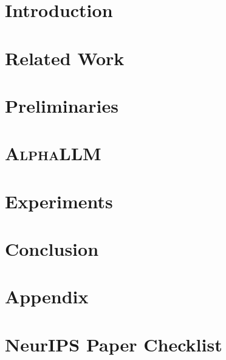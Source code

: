 \documentclass{article}
\newcommand{\model}[0]{\textsc{AlphaLLM}}
\begin{document}
\section{Introduction}
\label{sec:intro}


\section{Related Work}
\label{sec:related_work}


\section{Preliminaries}
\label{sec:pre}


\section{\model{}}
\label{sec:method}


\section{Experiments}
\label{sec:exp}


% 

\section{Conclusion}
\label{sec:con}



\medskip
\newpage



\newpage
\appendix
\section{Appendix}
\label{sec:appendix}


\newpage
\section*{NeurIPS Paper Checklist}
\label{sec:check_list}

\end{document}
